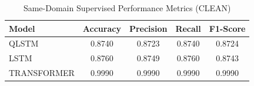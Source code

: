 \begin{table}[htbp]
\centering
\caption{Same-Domain Supervised Performance Metrics (CLEAN)}
\label{tab:clean_metrics}
\begin{tabular}{@{}lcccc@{}}
\toprule
\textbf{Model} & \textbf{Accuracy} & \textbf{Precision} & \textbf{Recall} & \textbf{F1-Score} \\ \midrule
QLSTM & 0.8740 & 0.8723 & 0.8740 & 0.8724 \\
LSTM & 0.8760 & 0.8749 & 0.8760 & 0.8743 \\
TRANSFORMER & 0.9990 & 0.9990 & 0.9990 & 0.9990 \\
\bottomrule
\end{tabular}
\end{table}
